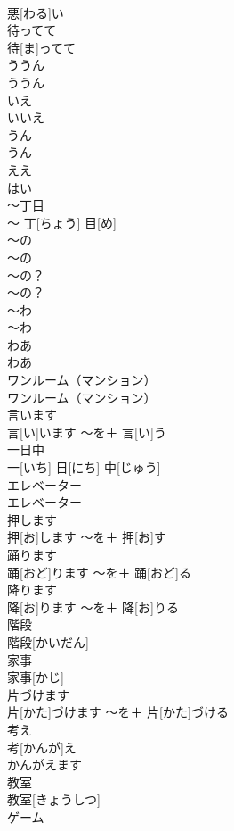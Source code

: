 \documentclass[8pt]{extreport}
\begin{document}
\begin{CJK}{UTF8}{min}
\\	悪[わる]い		
\\	待ってて	
\\	待[ま]ってて		
\\	ううん	
\\	ううん	
\\	いえ 
\\	いいえ 
\\	うん	
\\	うん	
\\	ええ 
\\	はい 
\\	〜丁目	
\\	〜 丁[ちょう] 目[め]		
\\	〜の	
\\	〜の		
\\	〜の？	
\\	〜の？		
\\	〜わ	
\\	〜わ		
\\	わあ	
\\	わあ		
\\	ワンルーム（マンション）	
\\	ワンルーム（マンション）		
\\	言います	
\\	言[い]います	〜を＋ 言[い]う	
\\	一日中	
\\	一[いち] 日[にち] 中[じゅう]		
\\	エレベーター	
\\	エレベーター		
\\	押します	
\\	押[お]します	〜を＋ 押[お]す	
\\	踊ります	
\\	踊[おど]ります	〜を＋ 踊[おど]る	
\\	降ります	
\\	降[お]ります	〜を＋ 降[お]りる	
\\	階段	
\\	階段[かいだん]		
\\	家事	
\\	家事[かじ]		
\\	片づけます	
\\	片[かた]づけます	〜を＋ 片[かた]づける	
\\	考え	
\\	考[かんが]え	
\\	かんがえます 
\\	教室	
\\	教室[きょうしつ]		
\\	ゲーム	

\end{CJK}
\end{document}

